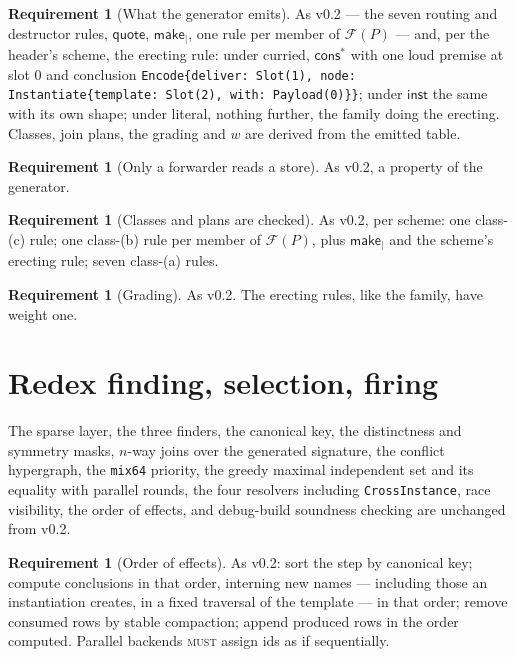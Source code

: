 \documentclass[11pt,a4paper]{article}
\newcommand{\code}[1]{\texttt{#1}}
\newcommand{\MUST}{\textsc{must}}
\theoremstyle{definition}
\newtheorem{requirement}[definition]{Requirement}
\theoremstyle{plain}
\newcommand{\inst}{\mathsf{inst}}
\newcommand{\Fam}{\mathcal{F}}
\newcommand{\cstar}{\mathsf{cons}^{*}}
\begin{document}
\begin{requirement}[What the generator emits]\label{req:gen}
As v0.2 --- the seven routing and destructor rules, $\mathsf{quote}$,
$\mathsf{make}_{\mid}$, one rule per member of $\Fam(P)$ --- and, per the
header's scheme, the erecting rule: under curried, $\cstar$ with one loud
premise at slot 0 and conclusion
\code{Encode\{deliver: Slot(1), node: Instantiate\{template: Slot(2), with:
Payload(0)\}\}}; under $\inst$ the same with its own shape; under literal,
nothing further, the family doing the erecting. Classes, join plans, the
grading and $w$ are derived from the emitted table.
\end{requirement}

\begin{requirement}[Only a forwarder reads a store]\label{req:quietjoin}
As v0.2, a property of the generator.
\end{requirement}

\begin{requirement}[Classes and plans are checked]\label{req:plans}
As v0.2, per scheme: one class-(c) rule; one class-(b) rule per member of
$\Fam(P)$, plus $\mathsf{make}_{\mid}$ and the scheme's erecting rule; seven
class-(a) rules.
\end{requirement}

\begin{requirement}[Grading]\label{req:grading}
As v0.2. The erecting rules, like the family, have weight one.
\end{requirement}

\section{Redex finding, selection, firing}\label{sec:machine}

The sparse layer, the three finders, the canonical key, the distinctness and
symmetry masks, $n$-way joins over the generated signature, the conflict
hypergraph, the \code{mix64} priority, the greedy maximal independent set and
its equality with parallel rounds, the four resolvers including
\code{CrossInstance}, race visibility, the order of effects, and debug-build
soundness checking are unchanged from v0.2.

\begin{requirement}[Order of effects]\label{req:insertorder}
As v0.2: sort the step by canonical key; compute conclusions in that order,
interning new names --- including those an instantiation creates, in a fixed
traversal of the template --- in that order; remove consumed rows by stable
compaction; append produced rows in the order computed. Parallel backends
\MUST{} assign ids as if sequentially.
\end{requirement}
\end{document}
